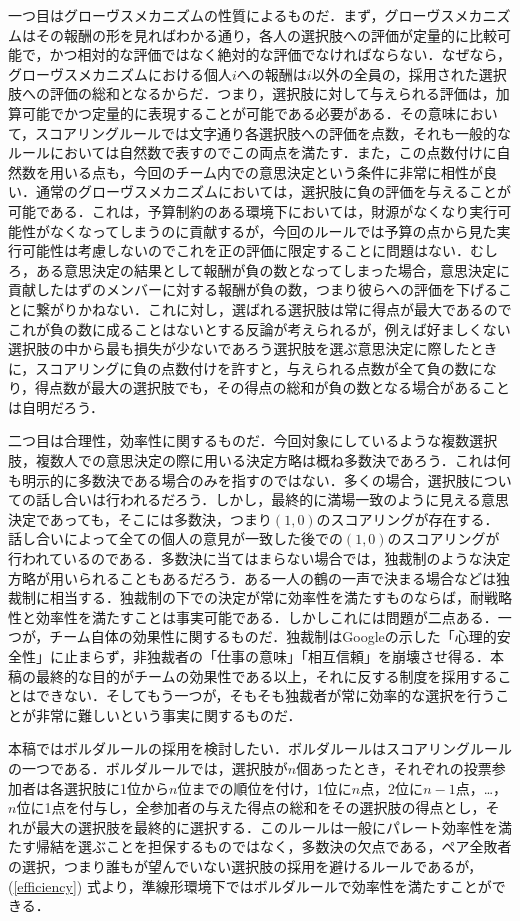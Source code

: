 \documentclass[a4paper, 11pt]{jsarticle}
\begin{document}
一つ目はグローヴスメカニズムの性質によるものだ．まず，グローヴスメカニズムはその報酬の形を見ればわかる通り，各人の選択肢への評価が定量的に比較可能で，かつ相対的な評価ではなく絶対的な評価でなければならない．なぜなら，グローヴスメカニズムにおける個人\(i\)への報酬は\(i\)以外の全員の，採用された選択肢への評価の総和となるからだ．つまり，選択肢に対して与えられる評価は，加算可能でかつ定量的に表現することが可能である必要がある．その意味において，スコアリングルールでは文字通り各選択肢への評価を点数，それも一般的なルールにおいては自然数で表すのでこの両点を満たす．また，この点数付けに自然数を用いる点も，今回のチーム内での意思決定という条件に非常に相性が良い．通常のグローヴスメカニズムにおいては，選択肢に負の評価を与えることが可能である．これは，予算制約のある環境下においては，財源がなくなり実行可能性がなくなってしまうのに貢献するが，今回のルールでは予算の点から見た実行可能性は考慮しないのでこれを正の評価に限定することに問題はない．むしろ，ある意思決定の結果として報酬が負の数となってしまった場合，意思決定に貢献したはずのメンバーに対する報酬が負の数，つまり彼らへの評価を下げることに繋がりかねない．これに対し，選ばれる選択肢は常に得点が最大であるのでこれが負の数に成ることはないとする反論が考えられるが，例えば好ましくない選択肢の中から最も損失が少ないであろう選択肢を選ぶ意思決定に際したときに，スコアリングに負の点数付けを許すと，与えられる点数が全て負の数になり，得点数が最大の選択肢でも，その得点の総和が負の数となる場合があることは自明だろう．

二つ目は合理性，効率性に関するものだ．今回対象にしているような複数選択肢，複数人での意思決定の際に用いる決定方略は概ね多数決であろう．これは何も明示的に多数決である場合のみを指すのではない．多くの場合，選択肢についての話し合いは行われるだろう．しかし，最終的に満場一致のように見える意思決定であっても，そこには多数決，つまり\((1,0)\)のスコアリングが存在する．話し合いによって全ての個人の意見が一致した後での\((1,0)\)のスコアリングが行われているのである．多数決に当てはまらない場合では，独裁制のような決定方略が用いられることもあるだろう．ある一人の鶴の一声で決まる場合などは独裁制に相当する．独裁制の下での決定が常に効率性を満たすものならば，耐戦略性と効率性を満たすことは事実可能である．しかしこれには問題が二点ある．一つが，チーム自体の効果性に関するものだ．独裁制はGoogle\cite{Google}の示した「心理的安全性」に止まらず，非独裁者の「仕事の意味」「相互信頼」を崩壊させ得る．本稿の最終的な目的がチームの効果性である以上，それに反する制度を採用することはできない．そしてもう一つが，そもそも独裁者が常に効率的な選択を行うことが非常に難しいという事実に関するものだ．

本稿ではボルダルールの採用を検討したい．ボルダルールはスコアリングルールの一つである．ボルダルールでは，選択肢が\(n\)個あったとき，それぞれの投票参加者は各選択肢に1位から\(n\)位までの順位を付け，1位に\(n\)点，2位に\(n-1\)点，\dots ，\(n\)位に1点を付与し，全参加者の与えた得点の総和をその選択肢の得点とし，それが最大の選択肢を最終的に選択する．このルールは一般にパレート効率性を満たす帰結を選ぶことを担保するものではなく，多数決の欠点である，ペア全敗者の選択，つまり誰もが望んでいない選択肢の採用を避けるルールであるが， (\ref{efficiency}) 式より，準線形環境下ではボルダルールで効率性を満たすことができる．
\end{document}
